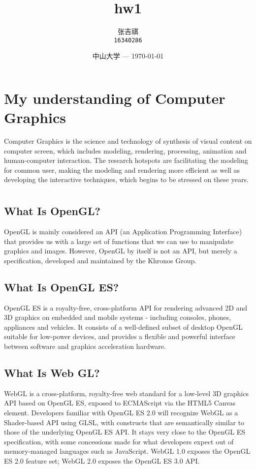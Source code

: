 \documentclass{ctexart}
\title{hw1} %
\author{张吉祺\\ \texttt{16340286}} %
\date{中山大学 --- \today} %
\begin{document}
\maketitle %

\section{My understanding of Computer Graphics}
Computer Graphics is the science and technology of synthesis of visual content on computer screen, which includes modeling, rendering, processing, animation and human-computer interaction. The research hotspots are facilitating the modeling for common user, making the modeling and rendering more efficient as well as developing the interactive techniques, which begins to be stressed on these years.

\section{}
\subsection{What Is OpenGL?}
OpenGL is mainly considered an API (an Application Programming Interface) that provides us with a large set of functions that we can use to manipulate graphics and images. However, OpenGL by itself is not an API, but merely a specification, developed and maintained by the Khronos Group.

\subsection{What Is OpenGL ES?}
OpenGL ES is a royalty-free, cross-platform API for rendering advanced 2D and 3D graphics on embedded and mobile systems - including consoles, phones, appliances and vehicles. It consists of a well-defined subset of desktop OpenGL suitable for low-power devices, and provides a flexible and powerful interface between software and graphics acceleration hardware.

\subsection{What Is Web GL?}
WebGL is a cross-platform, royalty-free web standard for a low-level 3D graphics API based on OpenGL ES, exposed to ECMAScript via the HTML5 Canvas element. Developers familiar with OpenGL ES 2.0 will recognize WebGL as a Shader-based API using GLSL, with constructs that are semantically similar to those of the underlying OpenGL ES API. It stays very close to the OpenGL ES specification, with some concessions made for what developers expect out of memory-managed languages such as JavaScript. WebGL 1.0 exposes the OpenGL ES 2.0 feature set; WebGL 2.0 exposes the OpenGL ES 3.0 API.
\end{document}
